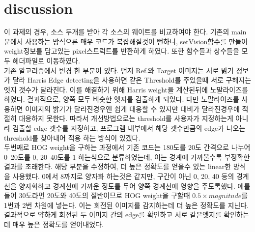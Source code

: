\documentclass[a4paper]{article}
\begin{document}
\section{discussion}
이 과제의 경우, 소스 두개를 받아 각 소스의 웨이트를 비교하여야 한다. 기존의 main문에서 사용하는 방식으론 매우 코드가 복잡해질것이 뻔하니, setVision함수를 만들어 weight정보를 담고있는 pixel스트럭트를 반환하게 하였다. 또한 함수들과 상수들을 모두 헤더파일로 이동하였다. \\
기존 알고리즘에서 변경 한 부분이 있다. 먼저 Ref.와 Target 이미지는 서로 밝기 정보가 달라 Harris Edge detecting을 사용하면 같은 Threshold를 주었을때 서로 구해지는 엣지 갯수가 달라진다. 이를 해결하기 위해 Harris weight을 계산된뒤에 노말라이즈를 하였다. 결과적으로, 양쪽 모두 비슷한 엣지를 검출하게 되었다. 다만 노말라이즈를 사용하면 이미지의 밝기가 달라진경우엔 쉽게 대응할 수 있지만 대비가 달라진경우에 적절히 대응하지 못한다. 따라서 개선방법으로는 threshold를 사용자가 지정하는게 아니라 검출할 edge 갯수를 지정하고, 프로그램 내부에서 해당 갯수만큼의 edge가 나오는 threshold를 찾아내어 적용 하는 방식이 있겠다.  \\ 
두번째로 HOG weight을 구하는 과정에서 기존 코드는 180도를 20도 간격으로 나누어 0~20도를 0, 20~40도를 1 하는식으로 분류하였는데, 이는 경계에 가까울수록 부정확한 결과를 초래한다. 해당 부분을 수정하여,  더 높은 정확도를 얻을수 있는 linear한 방식을 사용했다. 0에서 8까지로 양자화 하는것은 같지만, 구간이 아닌 0, 20, 40 등의 경계선을 양자화하고 경계선에 가까운 정도를 두어 양쪽 경계선에 영향을 주도록했다. 예를 들어 30도라면 20도와 40도의 절반이므로 HOG weight을 구할때 $0.5\times magnitude$를 1번과 2번 차원에 넣는다. 이는 회전된 이미지를 감지하는데 더 높은 정확도를 지닌다.\\
결과적으로 약하게 회전된 두 이미지 간의 edge를 확인하고 서로 같은엣지를 확인하는데 매우 높은 정확도를 얻어내었다.
\end{document}
